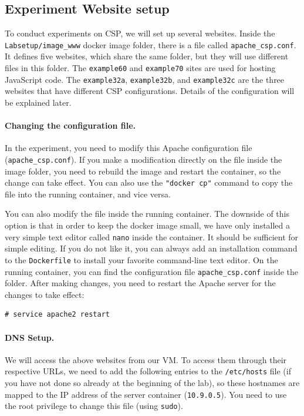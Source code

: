 \subsection{Experiment Website setup} 

To conduct experiments on CSP, we will set up several websites. 
Inside the \texttt{Labsetup/image\_www} docker image folder, 
there is a file called \texttt{apache\_csp.conf}.
It defines five websites, which share the same folder, but
they will use different files in this folder. 
The \texttt{example60} and \texttt{example70} sites are 
used for hosting JavaScript code.  The 
\texttt{example32a}, \texttt{example32b}, and 
\texttt{example32c} are the three websites that 
have different CSP configurations. Details of the configuration 
will be explained later.


\paragraph{Changing the configuration file.}
In the experiment, you need to modify this Apache 
configuration file (\texttt{apache\_csp.conf}). If you make a modification
directly on the file inside the image folder, you need to rebuild the image
and restart the container, so the change can take effect. 
You can also use the \texttt{"docker cp"} command
to copy the file into the running container, and vice versa.

You can also modify the file inside the running container.
The downside of this 
option is that in order to keep the docker image small, 
we have only installed a very simple text editor called \texttt{nano} 
inside the container. It should be sufficient for simple editing.   
If you do not like it, you can always add an installation command
to the \texttt{Dockerfile} to install your favorite command-line
text editor. 
On the running container, you can find the configuration
file \texttt{apache\_csp.conf} inside the 
 folder.  
After making changes, you need to restart the Apache server for the 
changes to take effect:

\begin{lstlisting}
# service apache2 restart
\end{lstlisting}


\paragraph{DNS Setup.}
We will access the above websites from our VM. 
To access them through their respective URLs, 
we need to add the following entries to the 
\texttt{/etc/hosts} file (if you have not done so already
at the beginning of the lab), so these hostnames are mapped to 
the IP address of the server container (\texttt{10.9.0.5}). 
You need to use the root privilege to 
change this file (using \texttt{sudo}).

